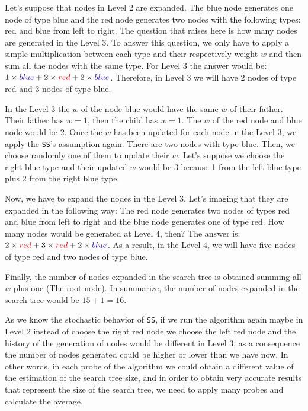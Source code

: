 Let's suppose that nodes in Level 2 are expanded. The blue node generates one node of type blue and the red node generates two nodes with the following types: red and blue from left to right. The question that raises here is how many nodes are generated in the Level 3. To answer this question, we only have to apply a simple multiplication between each type and their respectively weight $w$ and then sum all the nodes with the same type. For Level 3 the answer would be: $1 \times \textcolor{blue}{blue} + 2 \times \textcolor{red}{red} + 2 \times \textcolor{blue}{blue}$. Therefore, in Level 3 we will have 2 nodes of type red and 3 nodes of type blue.

In the Level 3 the $w$ of the node blue would have the same $w$ of their father. Their father has $w = 1$, then the child has $w = 1$. The $w$ of the red node and blue node would be 2. Once the $w$ has been updated for each node in the Level 3,	 we apply the \texttt{SS}'s assumption again. There are two nodes with type blue. Then, we choose randomly one of them to update their $w$. Let's suppose we choose the right blue type and their updated $w$ would be 3 because 1 from the left blue type plus 2 from the right blue type.

Now, we have to expand the nodes in the Level 3. Let's imaging that they are expanded in the following way: The red node generates two nodes of types red and blue from left to right and the blue node generates one of type red. How many nodes would be generated at Level 4, then? The answer is: $2 \times \textcolor{red}{red} + 3 \times \textcolor{red}{red} + 2 \times \textcolor{blue}{blue}$. As a result, in the Level 4, we will have five nodes of type red and two nodes of type blue.

Finally, the number of nodes expanded in the search tree is obtained summing all $w$ plus one (The root node). In summarize, the number of nodes expanded in the search tree would be $ 15 + 1 = 16$. 

As we know the stochastic behavior of \texttt{SS}, if we run the algorithm again maybe in Level 2 instead of choose the right red node we choose the left red node and the history of the generation of nodes would be different in Level 3, as a consequence the number of nodes generated could be higher or lower than we have now. In other words, in each probe of the algorithm we could obtain a different value of the estimation of the search tree size, and in order to obtain very accurate results that represent the size of the search tree, we need to apply many probes and calculate the average.

\clearpage